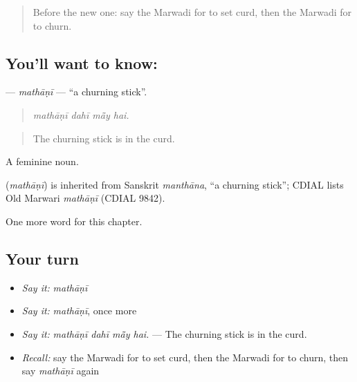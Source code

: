 \label{lesson:MW-C181-mathani}



\begin{quote}
Before the new one: say the Marwadi for to set curd, then the Marwadi for to churn.
\end{quote}

\subsection*{You'll want to know: }
\textbf{} — \emph{mathāṇī} — \textquotedblleft{}a churning stick\textquotedblright{}.

\begin{quote}
   
\end{quote}

\begin{quote}
\emph{mathāṇī dahī mā̃y hai.}
\end{quote}

\begin{quote}
The churning stick is in the curd.
\end{quote}

A feminine noun.

\begin{cousinweb}
\textbf{} (\emph{mathāṇī}) is inherited from Sanskrit \emph{manthāna}, \textquotedblleft{}a churning stick\textquotedblright{}; CDIAL lists Old Marwari \emph{mathāṇī} (CDIAL 9842).
\end{cousinweb}

\begin{grammarlens}[title={What you've built}]
One more word for this chapter.
\end{grammarlens}

\subsection*{Your turn}
\begin{itemize}
\raggedright
  \item \emph{Say it:} \emph{mathāṇī}
  \item \emph{Say it:} \emph{mathāṇī}, once more
  \item \emph{Say it:} \emph{mathāṇī dahī mā̃y hai.} — The churning stick is in the curd.
  \item \emph{Recall:} say the Marwadi for to set curd, then the Marwadi for to churn, then say \emph{mathāṇī} again
\end{itemize}

